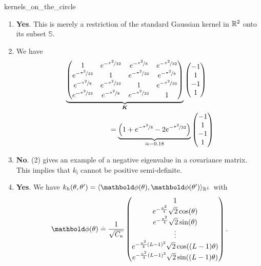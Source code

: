 \begin{solution}{kernels_on_the_circle}
  \begin{enumerate}[beginpenalty=10000]
    \item \textbf{Yes}. This is merely a restriction of the standard Gaussian kernel in $\mathbb{R}^2$ onto its subset $\mathbb{S}$.

    \item We have \[
      \begin{multlined}[t]
        \underbrace{
      \begin{pmatrix}
      1 & e^{-\nicefrac{\pi^2}{32}} & e^{-\nicefrac{\pi^2}{8}} & e^{-\nicefrac{\pi^2}{32}} \\
      e^{-\nicefrac{\pi^2}{32}} & 1 & e^{-\nicefrac{\pi^2}{32}} & e^{-\nicefrac{\pi^2}{8}} \\
      e^{-\nicefrac{\pi^2}{8}} & e^{-\nicefrac{\pi^2}{32}} & 1 & e^{-\nicefrac{\pi^2}{32}} \\
      e^{-\nicefrac{\pi^2}{32}} & e^{-\nicefrac{\pi^2}{8}} & e^{-\nicefrac{\pi^2}{32}} & 1
      \end{pmatrix}
      }_{\boldsymbol{K}}
      \begin{pmatrix}
      -1 \\
      1 \\
      -1 \\
      1
      \end{pmatrix} \\
      =
      \underbrace{
      \left(
      1 + e^{-\nicefrac{\pi^2}{8}} - 2 e^{-\nicefrac{\pi^2}{32}}
      \right)}_{\approx -0.18}
      \begin{pmatrix}
      -1 \\
      1 \\
      -1 \\
      1
      \end{pmatrix}
      \end{multlined}
    \]

    \item \textbf{No}. (2) gives an example of a negative eigenvalue in a covariance matrix.
    This implies that $k_{\text{i}}$ cannot be positive semi-definite.

    \item \textbf{Yes}. We have $k_h(\theta, \theta') = \langle \vphi(\theta), \vphi(\theta') \rangle_{\mathbb{R}^{L}}$ with \[
      \vphi(\theta) \defeq \frac{1}{\sqrt{C_{\kappa}}} \begin{pmatrix}
      1 \\
      e^{-\frac{\kappa^2}{4}} \sqrt{2} \cos(\theta) \\
      e^{-\frac{\kappa^2}{4}} \sqrt{2} \sin(\theta) \\
      \vdots \\
      e^{-\frac{\kappa^2}{4} (L-1)^2} \sqrt{2} \cos((L-1) \theta) \\
      e^{-\frac{\kappa^2}{4} (L-1)^2} \sqrt{2} \sin((L-1) \theta)
      \end{pmatrix}.
    \]
  \end{enumerate}
\end{solution}

